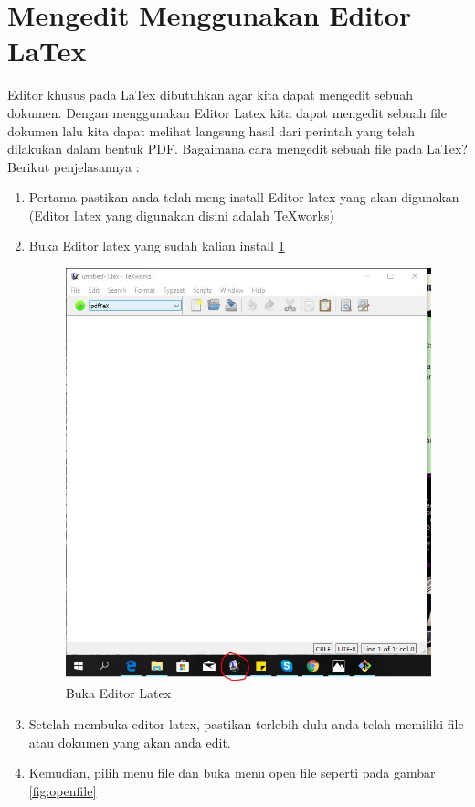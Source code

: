 \section{Mengedit Menggunakan Editor LaTex}
Editor khusus pada LaTex dibutuhkan agar kita dapat mengedit sebuah dokumen. Dengan menggunakan Editor Latex kita dapat mengedit sebuah file dokumen lalu kita dapat melihat langsung hasil dari perintah yang telah dilakukan dalam bentuk PDF. Bagaimana cara mengedit sebuah file pada LaTex? Berikut penjelasannya : 
\begin{enumerate}
\item Pertama pastikan anda telah meng-install Editor latex yang akan digunakan (Editor latex yang digunakan disini adalah TeXworks)
\item Buka Editor latex yang sudah kalian install \ref{fig:openeditor}
  \begin{figure}[!htbp]
  \centering
  \includegraphics[width=.75\textwidth]{figures/openeditor.JPG}
  \caption{Buka Editor Latex}\label{fig:openeditor}
\end{figure}
\item Setelah membuka editor latex, pastikan terlebih dulu anda telah memiliki file atau dokumen yang akan anda edit. 
\item Kemudian, pilih menu file dan buka menu open file seperti pada gambar \ref{fig:openfile}
  \begin{figure}[!htbp]
  \centering

\end{figure}
\end{enumerate}
